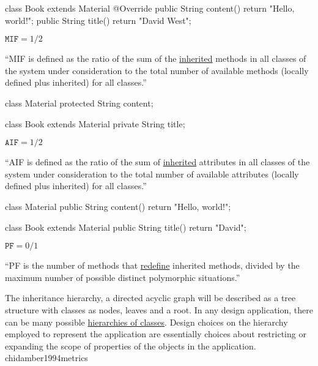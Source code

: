 \documentclass{article}
\begin{document}
\begin{multicols}{2}
{\small\begin{ffcode}
class Book extends Material {
  @Override
  public String content() {
    return "Hello, world!";
  }
  public String title() {
    return "David West";
  }
}
\end{ffcode}
}
\par\columnbreak\par
\(\texttt{MIF} = 1/2\)\par
``MIF is defined as the ratio of the sum of the \ul{inherited} methods in all classes of
the system under consideration to the total number of available methods
(locally defined plus inherited) for all classes.''
\end{multicols}
\plush{}

\begin{multicols}{2}
{\small\begin{ffcode}
class Material {
  protected String content;
}

class Book extends Material {
  private String title;
}
\end{ffcode}
}
\par\columnbreak\par
\(\texttt{AIF} = 1/2\)\par
``AIF is defined as the ratio of the sum of \ul{inherited} attributes in all classes of
the system under consideration to the total number of available attributes
(locally defined plus inherited) for all classes.''
\end{multicols}
\plush{}

\begin{multicols}{2}
{\small\begin{ffcode}
class Material {
  public String content() {
    return "Hello, world!";
  }
}

class Book extends Material {
  public String title() {
    return "David";
  }
}
\end{ffcode}
}
\par\columnbreak\par
\(\texttt{PF} = 0/1\)\par
``PF is the number of methods that \ul{redefine} inherited methods, divided by the
maximum number of possible distinct polymorphic situations.''
\end{multicols}
\plush{}

  {The inheritance hierarchy, a directed acyclic graph will be described as a tree structure with classes as nodes, leaves and a root. In any design application, there can be many possible \ul{hierarchies of classes}. Design choices on the hierarchy employed to represent the application are essentially choices about restricting or expanding the scope of properties of the objects in the application.}
  {chidamber1994metrics}
\end{document}
